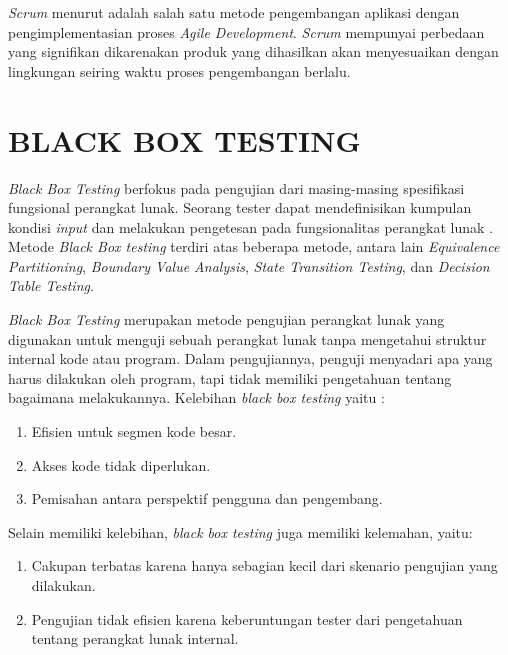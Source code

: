 \par \textit{Scrum} menurut \citep{wahyudi2018analisis} adalah salah satu metode pengembangan aplikasi dengan pengimplementasian proses \textit{Agile Development}. \textit{Scrum} mempunyai perbedaan yang signifikan dikarenakan produk yang dihasilkan akan menyesuaikan dengan lingkungan seiring waktu proses pengembangan berlalu.

\section{\uppercase{Black Box Testing}}
\textit{Black Box Testing} berfokus pada pengujian dari masing-masing spesifikasi fungsional perangkat lunak. Seorang tester dapat mendefinisikan kumpulan kondisi \textit{input} dan melakukan pengetesan pada fungsionalitas perangkat lunak \citep{mustaqbal2015pengujian}. Metode \textit{Black Box testing} terdiri atas beberapa metode, antara lain \textit{Equivalence Partitioning}, \textit{Boundary Value Analysis}, \textit{State Transition Testing}, dan \textit{Decision Table Testing}.

\par \textit{Black Box Testing} merupakan metode pengujian perangkat lunak yang digunakan untuk menguji sebuah perangkat lunak tanpa 
mengetahui struktur internal kode atau program. Dalam pengujiannya, penguji menyadari apa yang harus dilakukan oleh program, tapi tidak memiliki pengetahuan tentang bagaimana melakukannya. Kelebihan \textit{black box testing} yaitu :

\begin{enumerate}
	\item Efisien untuk segmen kode besar.
	\item Akses kode tidak diperlukan.
	\item Pemisahan antara perspektif pengguna dan pengembang.
\end{enumerate}

\par Selain memiliki kelebihan, \textit{black box testing} juga memiliki kelemahan, yaitu:

\begin{enumerate}
	\item Cakupan terbatas karena hanya sebagian kecil dari skenario pengujian yang dilakukan. 
	\item Pengujian tidak efisien karena keberuntungan tester dari pengetahuan tentang perangkat lunak internal.
\end{enumerate}

